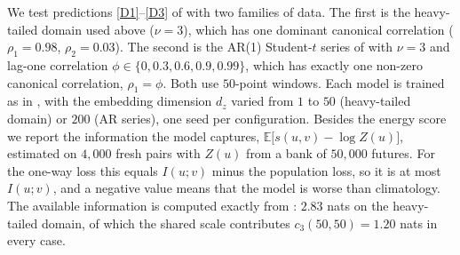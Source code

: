 \documentclass[11pt]{article}
\theoremstyle{plain}
\theoremstyle{definition}
\theoremstyle{remark}
\newcommand{\E}{\mathbb{E}}
\begin{document}
We test predictions \ref{D1}--\ref{D3} of  with two
families of data. The first is the heavy-tailed domain used above ($\nu=3$),
which has one dominant canonical correlation ($\rho_1=0.98$, $\rho_2=0.03$).
The second is the AR(1) Student-$t$ series of  with $\nu=3$ and
lag-one correlation $\phi\in\{0,0.3,0.6,0.9,0.99\}$, which has exactly one
non-zero canonical correlation, $\rho_1=\phi$. Both use $50$-point windows.
Each model is trained as in , with the embedding
dimension $d_z$ varied from $1$ to $50$ (heavy-tailed domain) or $200$ (AR
series), one seed per configuration. Besides the energy score we report the
information the model captures,
$\E\bigl[s(u,v)-\log Z(u)\bigr]$, estimated on $4{,}000$ fresh pairs with
$Z(u)$ from a bank of $50{,}000$ futures. For the one-way loss this equals $I(u;v)$ minus the
population loss, so it is at most $I(u;v)$, and a negative value means that
the model is worse than climatology. The available information is computed
exactly from : $2.83$ nats on the heavy-tailed domain, of
which the shared scale contributes $c_3(50,50)=1.20$ nats in every case.
\end{document}
